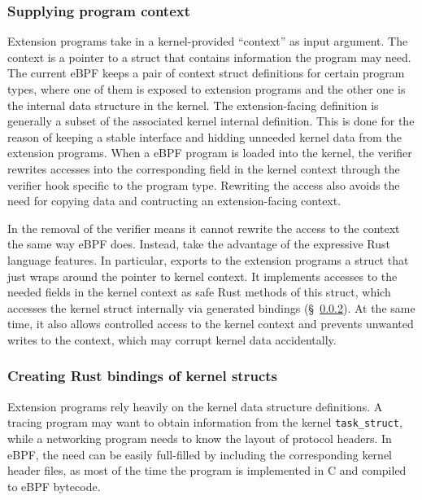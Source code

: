 
\subsubsection{Supplying program context}
\label{impl:ctx-converison}
Extension programs take in a kernel-provided ``context'' as input argument.
The context is a pointer to a struct that contains information the program may
    need.
The current eBPF keeps a pair of context struct definitions for certain program
    types, where one of them is exposed to extension programs and the other one
    is the internal data structure in the kernel.
The extension-facing definition is generally a subset of the associated kernel
    internal definition.
This is done for the reason of keeping a stable interface and hidding unneeded
    kernel data from the extension programs.
When a eBPF program is loaded into the kernel, the verifier rewrites accesses
    into the corresponding field in the kernel context
    through the verifier hook specific to the program type.
Rewriting the access also avoids the need for copying data and contructing an
    extension-facing context.

In \projname{} the removal of the verifier means it cannot rewrite the access
    to the context the same way eBPF does.
Instead, \projname{} take the advantage of the expressive Rust language
    features.
In particular, \projname{} exports to the extension programs a struct that just
    wraps around the pointer to kernel context.
It implements accesses to the needed fields in the kernel context as safe Rust
    methods of this struct, which accesses the kernel struct internally via
    generated bindings (\S~\ref{impl:crate:binding}).
At the same time, it also allows controlled access to the kernel context and
    prevents unwanted writes to the context, which may corrupt kernel data
    accidentally.

\subsubsection{Creating Rust bindings of kernel structs}
\label{impl:crate:binding}
Extension programs rely heavily on the kernel data structure definitions.
A tracing program may want to obtain information from the kernel
    \texttt{task\_struct}, while a networking program needs to know the layout
    of protocol headers.
In eBPF, the need can be easily full-filled by including the corresponding
    kernel header files, as most of the time the program is implemented in C
    and compiled to eBPF bytecode.

